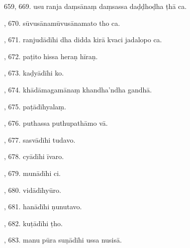 659, 669. usu ranja daṃsānaṃ daṃsassa daḍḍhoḍha ṭhā ca.\par {}, 670. sūvusānamūvusānamato tho ca.\par {}, 671. ranjudādīhi dha didda kirā kvaci jadalopo ca.\par {}, 672. paṭito hissa heraṇ hīraṇ.\par {}, 673. kaḍyādīhi ko.\par {}, 674. khādāmagamānaṃ khandha’ndha gandhā.\par {}, 675. paṭādīhyalaṃ.\par {}, 676. puthassa puthupathāmo vā.\par {}, 677. sasvādīhi tudavo.\par {}, 678. cyādīhi īvaro.\par {}, 679. munādīhi ci.\par {}, 680. vidādīhyūro.\par {}, 681. hanādīhi ṇunutavo.\par {}, 682. kuṭādīhi ṭho.\par {}, 683. manu pūra suṇādīhi ussa nusisā.\par \noindent
